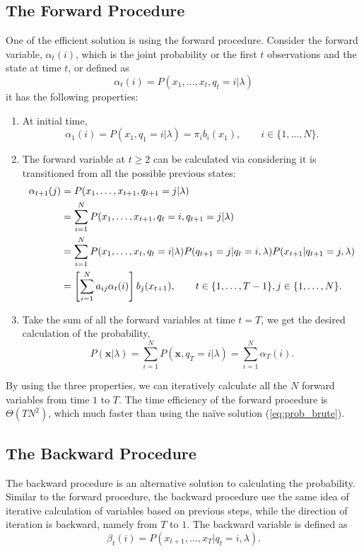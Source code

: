 \documentclass[12pt,final,twoside]{report}
\theoremstyle{plain}
\theoremstyle{definition}
\theoremstyle{remark}
\begin{document}
\subsection{The Forward Procedure}
One of the efficient solution is using the forward procedure. Consider the forward variable, $\alpha_t(i)$, which is the joint probability or the first $t$ observations and the state at time $t$, or defined as
\begin{equation}
  \alpha_t(i) = P(x_1,\dots,x_t,q_t=i|\lambda) 
\end{equation}
it has the following properties:
\begin{enumerate}
  \item At initial time,
    \begin{equation}
      \alpha_1(i) = P(x_1,q_1=i|\lambda) = \pi_i b_i(x_1), \qquad i \in \{1,\dots,N\} .
    \end{equation}
  \item The forward variable at $t \geq 2$ can be calculated via considering it is transitioned from all the possible previous states:
    \begin{align}
      \alpha_{t+1}(j) &= P(x_1,\dots,x_{t+1},q_{t+1}=j|\lambda) \notag\\
      &= \sum_{i=1}^{N} P(x_1,\dots,x_{t+1},q_t=i,q_{t+1}=j|\lambda) \notag\\
      &= \sum_{i=1}^{N} P(x_1,\dots,x_t,q_t=i|\lambda) P(q_{t+1}=j|q_t=i,\lambda) P(x_{t+1}|q_{t+1}=j,\lambda) \notag\\
      &= \left[ \sum_{i=1}^{N} a_{ij} \alpha_t(i) \right] b_j(x_{t+1}), \qquad t \in \{1,\dots,T - 1\}, j \in \{1,\dots,N\} .
    \end{align}
  \item Take the sum of all the forward variables at time $t = T$, we get the desired calculation of the probability,
    \begin{equation}
      P(\mathbf{x}|\lambda) = \sum_{i=1}^N P(\mathbf{x},q_T=i|\lambda) = \sum_{i=1}^N \alpha_T(i) .
    \end{equation}
\end{enumerate}

By using the three properties, we can iteratively calculate all the $N$ forward variables from time $1$ to $T$. The time efficiency of the forward procedure is $\Theta(TN^2)$, which much faster than using the na\"ive solution (\cref{eq:prob_brute}).

\subsection{The Backward Procedure}
The backward procedure is an alternative solution to calculating the probability. Similar to the forward procedure, the backward procedure use the same idea of iterative calculation of variables based on previous steps, while the direction of iteration is backward, namely from $T$ to $1$. The backward variable is defined as
\begin{equation}
  \beta_t(i) = P(x_{t+1},\dots,x_T|q_t=i,\lambda) .
\end{equation}
\end{document}
